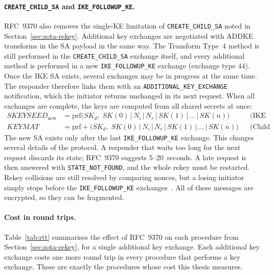 \paragraph{\texttt{CREATE\_CHILD\_SA} and \texttt{IKE\_FOLLOWUP\_KE}.}
RFC~9370 also removes the single-KE limitation of \texttt{CREATE\_CHILD\_SA}
noted in Section~\ref{sec:sota-rekey}. Additional key exchanges are negotiated
with ADDKE transforms in the SA payload in the same way. The Transform Type~4
method is still performed in the \texttt{CREATE\_CHILD\_SA} exchange itself,
and every additional method is performed in a new \texttt{IKE\_FOLLOWUP\_KE}
exchange (exchange type 44). Once the IKE SA exists, several exchanges may be in
progress at the same time. The responder therefore links them with an
\texttt{ADDITIONAL\_KEY\_EXCHANGE} notification, which the initiator returns
unchanged in its next request. When all exchanges are complete, the keys are
computed from all shared secrets at once:
\begin{align}
    \mathit{SKEYSEED}_{\mathrm{new}} &= \mathrm{prf}\bigl(SK_d,\; SK(0) \,|\, N_i \,|\, N_r \,|\, SK(1) \,|\, \ldots \,|\, SK(n)\bigr)
        && \text{(IKE SA rekey)} \\
    \mathit{KEYMAT} &= \mathrm{prf+}\bigl(SK_d,\; SK(0) \,|\, N_i \,|\, N_r \,|\, SK(1) \,|\, \ldots \,|\, SK(n)\bigr)
        && \text{(Child SA)}
\end{align}
The new SA exists only after the last \texttt{IKE\_FOLLOWUP\_KE} exchange.
This changes several details of the protocol. A responder that waits too long
for the next request discards its state; RFC~9370 suggests 5--20~seconds.
A late request is then answered with \texttt{STATE\_NOT\_FOUND}, and the whole
rekey must be restarted. Rekey collisions are still resolved by comparing
nonces, but a losing initiator simply stops before the
\texttt{IKE\_FOLLOWUP\_KE} exchanges~\cite{rfc9370}. All of these messages are
encrypted, so they can be fragmented.

\paragraph{Cost in round trips.}
Table~\ref{tab:rtt} summarises the effect of RFC~9370 on each procedure from
Section~\ref{sec:sota-rekey}, for a single additional key exchange. Each
additional key exchange costs one more round trip in every procedure that
performs a key exchange. These are exactly the procedures whose cost this
thesis measures.

